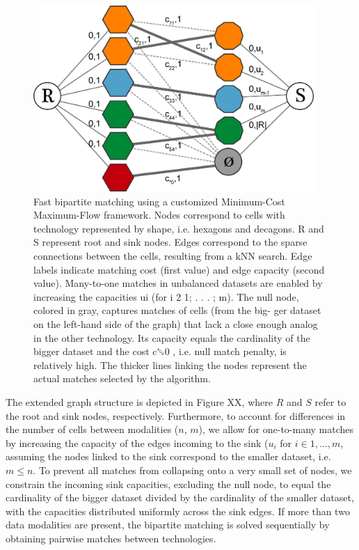 \begin{figure}
  \begin{center}
    \includegraphics[width=0.95\textwidth]{figures/integration/null-cell.png}
  \end{center}
  \caption{Fast bipartite matching using a customized Minimum-Cost Maximum-Flow framework. Nodes correspond to cells with technology represented by shape, i.e. hexagons and decagons. R and S represent root and sink nodes. Edges correspond to the sparse connections between the cells, resulting from a kNN search. Edge labels indicate matching cost (first value) and edge capacity (second value). Many-to-one matches in unbalanced datasets are enabled by increasing the capacities ui (for i 2 1; . . . ; m). The null node, colored in gray, captures matches of cells (from the big- ger dataset on the left-hand side of the graph) that lack a close enough analog in the other technology. Its capacity equals the cardinality of the bigger dataset and the cost c␆0 , i.e. null match penalty, is relatively high. The thicker lines linking the nodes represent the actual matches selected by the algorithm.}
  \label{fig:null-cell}
\end{figure}

The extended graph structure is depicted in Figure XX, where $R$ and $S$ refer to the root and sink nodes, respectively.
Furthermore, to account for differences in the number of cells between modalities ($n$, $m$), we allow for one-to-many matches by increasing the capacity of the edges incoming to the sink ($u_i$ for $i \in {1, \ldots, m}$, assuming the nodes linked to the sink correspond to the smaller dataset, i.e. $m \leq n$.
To prevent all matches from collapsing onto a very small set of nodes, we constrain the incoming sink capacities, excluding the null node, to equal the cardinality of the bigger dataset divided by the cardinality of the smaller dataset, with the capacities distributed uniformly across the sink edges.
If more than two data modalities are present, the bipartite matching is solved sequentially by obtaining pairwise matches between technologies.
